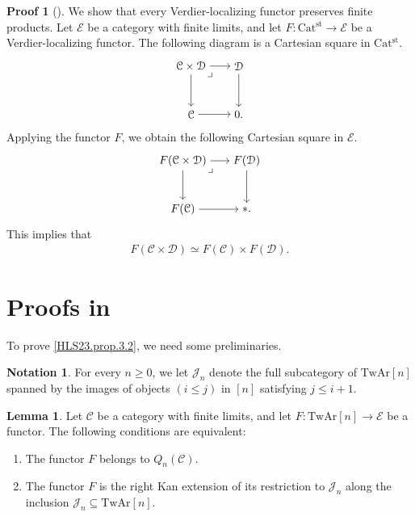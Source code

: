 \documentclass[a4paper,dvipdfmx,11pt,reqno]{amsart}
\newcommand{\C}{\mathcal{C}}
\newcommand{\D}{\mathcal{D}}
\newcommand{\E}{\mathcal{E}}
\newcommand{\J}{\mathcal{J}}
\newcommand{\Catst}{\mathrm{Cat^{st}}}
\newcommand{\TwAr}{\mathrm{TwAr}}
\theoremstyle{definition}
\newtheorem{lemma}[theorem]{Lemma}
\newtheorem{notation}[theorem]{Notation}
\newtheorem{newproof}[theorem]{Proof}
\begin{document}
\begin{newproof}[] \label{proof_of_HLS23.obs.2.2}
  We show that every Verdier-localizing functor preserves finite products.
  Let $\E$ be a category with finite limits, and let $F : \Catst \to \E$ be a Verdier-localizing functor.
  The following diagram is a Cartesian square in $\Catst$.
  \[\begin{tikzpicture}[auto,->] 
    \node (tl) at (0,1.5) {$\C \times \D$}; 
    \node (tr) at (1.5,1.5) {$\D$};
    \node (bl) at (0,0) {$\C$}; 
    \node (br) at (1.5,0) {$0.$}; 
    \draw (tl) -- node {} (tr); 
    \draw (bl) -- node[swap] {} (br); 
    \draw (tl) -- node[swap] {} (bl);
    \draw (tr) -- node {} (br); 
    \node at (tl.south east) {$\lrcorner$};
  \end{tikzpicture}\]
  Applying the functor $F$, we obtain the following Cartesian square in $\E$.
  \[\begin{tikzpicture}[auto,->] 
    \node (tl) at (0,1.5) {$F(\C \times \D)$}; 
    \node (tr) at (2,1.5) {$F(\D)$};
    \node (bl) at (0,0) {$F(\C)$}; 
    \node (br) at (2,0) {$\ast.$}; 
    \draw (tl) -- node {} (tr); 
    \draw (bl) -- node[swap] {} (br); 
    \draw (tl) -- node[swap] {} (bl);
    \draw (tr) -- node {} (br); 
    \node at (tl.south east) {$\lrcorner$};
  \end{tikzpicture}\]
  This implies that 
  \begin{align*}
    F(\C \times \D) \simeq F(\C) \times F(\D).
  \end{align*}
\end{newproof}


\section{Proofs in }

To prove \cref{HLS23.prop.3.2}, we need some preliminaries.

\begin{notation}
  For every $n \geq 0$, we let $\J_n$ denote the full subcategory of $\TwAr[n]$ spanned by the images of objects $(i \leq j)$ in $[n]$ satisfying $j \leq i+1$.
\end{notation}

\begin{lemma} \label{Ber.lem.4.28}
  Let $\C$ be a category with finite limits, and let $F : \TwAr[n] \to \E$ be a functor.
  The following conditions are equivalent:
  \begin{enumerate}
    \item The functor $F$ belongs to $Q_n(\C)$.
    \item The functor $F$ is the right Kan extension of its restriction to $\J_n$ along the inclusion $\J_n \subseteq \TwAr[n]$.
  \end{enumerate}
\end{lemma}
\end{document}
